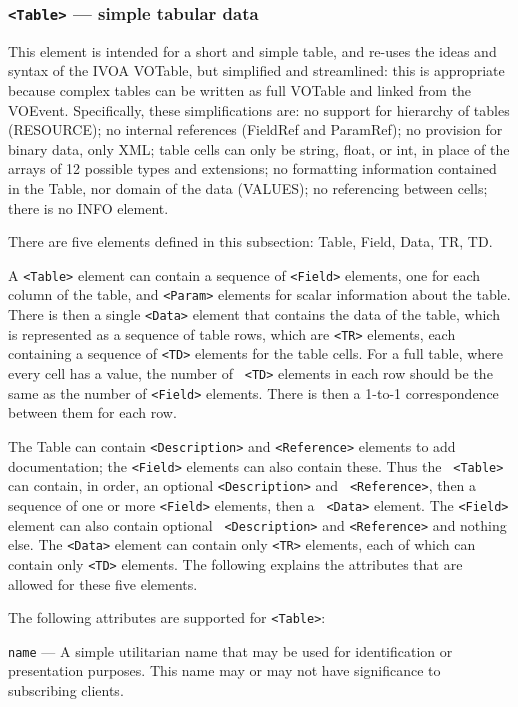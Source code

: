 \documentclass[11pt,a4paper]{ivoa}
\begin{document}
\subsubsection{{\tt <Table>} --- simple tabular data}
\label{sec:3.3.3}
This element is intended for a short and simple table, and re-uses the ideas and 
syntax of the IVOA VOTable, but simplified and streamlined: this is appropriate 
because complex tables can be written as full VOTable and linked from the 
VOEvent. Specifically, these simplifications are: no support for hierarchy of 
tables (RESOURCE); no internal references (FieldRef and ParamRef); no provision 
for binary data, only XML; table cells can only be string, float, or int, in 
place of the arrays of 12 possible types and extensions; no formatting 
information contained in the Table, nor domain of the data (VALUES); no 
referencing between cells; there is no INFO element. 

There are five elements defined in this subsection: Table, Field, Data, TR, TD.

A {\tt <Table>} element can contain a sequence of {\tt <Field>} elements, one 
for each column of the table, and {\tt <Param>} elements for scalar information 
about the table. There is then a single {\tt <Data>} element that contains the 
data of the table, which is represented as a sequence of table rows, which are 
{\tt <TR>} elements, each containing a sequence of {\tt <TD>} elements for the 
table cells. For a full table, where every cell has a value, the number of {\tt 
<TD>} elements in each row should be the same as the number of {\tt <Field>} 
elements. There is then a 1-to-1 correspondence between them for each row. 

The Table can contain {\tt <Description>} and {\tt <Reference>} elements to add 
documentation; the {\tt <Field>} elements can also contain these. Thus the {\tt 
<Table>} can contain, in order, an optional {\tt <Description>} and {\tt 
<Reference>}, then a sequence of one or more {\tt <Field>} elements, then a {\tt 
<Data>} element. The {\tt <Field>} element can also contain optional {\tt 
<Description>} and {\tt <Reference>} and nothing else. The {\tt <Data>} element 
can contain only {\tt <TR>} elements, each of which can contain only {\tt <TD>} 
elements. The following explains the attributes that are allowed for these five 
elements. 

The following attributes are supported for {\tt <Table>}: 

 {\tt name}\label{sec:3.3.3.1} --- A simple utilitarian 
name that may be used for identification or presentation purposes. This name 
may or may not have significance to subscribing clients. 
\end{document}
